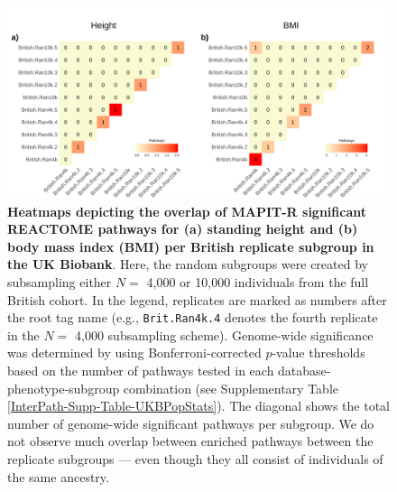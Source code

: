 \documentclass[10pt]{article}
\begin{document}
\begin{landscape}
\begin{figure}[htbp]
\centering
\includegraphics[scale=.2]{Images/Supp/InterPath_Supp_Figure_BritReps_Heatplots_REACTOME_vs4.png}
\caption{\textbf{Heatmaps depicting the overlap of MAPIT-R significant REACTOME pathways for (a) standing height and (b) body mass index (BMI) per British replicate subgroup in the UK Biobank}. Here, the random subgroups were created by subsampling either $N =$ 4,000 or 10,000 individuals from the full British cohort. In the legend, replicates are marked as numbers after the root tag name (e.g., \texttt{Brit.Ran4k.4} denotes the fourth replicate in the $N =$ 4,000 subsampling scheme). Genome-wide significance was determined by using Bonferroni-corrected $p$-value thresholds based on the number of pathways tested in each database-phenotype-subgroup combination (see Supplementary Table \ref{InterPath-Supp-Table-UKBPopStats}). The diagonal shows the total number of genome-wide significant pathways per subgroup. We do not observe much overlap between enriched pathways between the replicate subgroups --- even though they all consist of individuals of the same ancestry.}
\label{InterPath-Supp-Figure-BritReps-Heatplots-AllPaths-REACTOME}
\end{figure}
\clearpage
\end{landscape}

\end{document}

